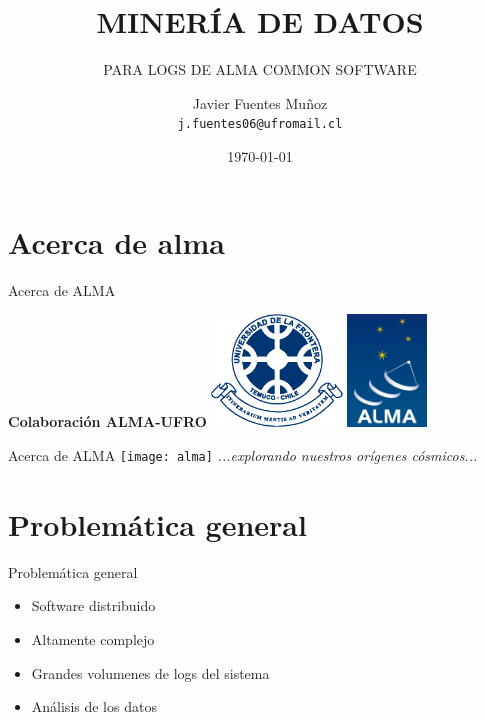 \documentclass[11pt]{beamer}
\author{Javier Fuentes Muñoz \\ \texttt{j.fuentes06@ufromail.cl}}
\title{MINERÍA DE DATOS}
\subtitle{PARA LOGS DE ALMA COMMON SOFTWARE}
\institute{Universidad de La Frontera}
\date{\today}
\begin{document}
\begin{frame}
\titlepage
\end{frame}

\section{Acerca de alma}

\begin{frame}{Acerca de ALMA}

\centering\textbf{Colaboración ALMA-UFRO}
\vfill
		\centering
		\includegraphics[height=3cm]{logo}
		\hspace{1cm}
		\includegraphics[height=3cm]{alma-logo}
	
\end{frame}

\begin{frame}{Acerca de ALMA}
	\centering
	\texttt{[image: alma]}
	\vfill
	\textit{...explorando nuestros orígenes cósmicos...}
	
\end{frame}

\section{Problemática general}

\begin{frame}{Problemática general}
	\begin{itemize}
		\item Software distribuido
		\item Altamente complejo
		\item Grandes volumenes de logs del sistema
		\item Análisis de los datos
	\end{itemize}
\end{frame}
\end{document}
